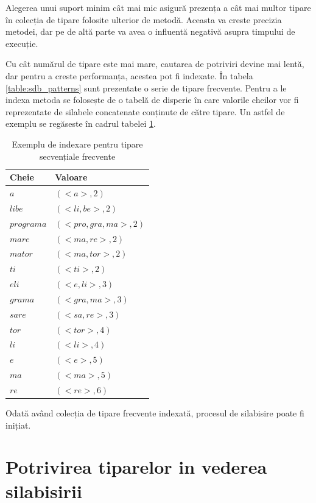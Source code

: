 Alegerea unui suport minim cât mai mic asigură prezența a cât mai multor tipare în colecția de tipare folosite ulterior de metodă. Aceasta va creste precizia metodei, dar pe de altă parte va avea o influentă negativă asupra timpului de execuție. 

Cu cât numărul de tipare este mai mare, cautarea de potriviri devine mai lentă, dar pentru a creste performanța, acestea pot fi indexate. În tabela \ref{table:sdb_patterns} sunt prezentate o serie de tipare frecvente. Pentru a le indexa metoda se folosește de o tabelă de disperie în care valorile cheilor vor fi reprezentate de silabele concatenate conținute de către tipare. Un astfel de exemplu se regăseste în cadrul tabelei \ref{table:sdb_index}. 

\begin{table}[h!]
\centering    
\begin{tabular}{|l|l|}    
\hline      
Cheie & Valoare\\
\hline
$a$ 		& $(<a>, 2)$  \\
$libe$ 		& $(<li, be>, 2)$  \\
$programa$ 	& $(<pro, gra, ma>, 2)$  \\
$mare$ 		& $(<ma, re>, 2)$  \\
$mator$ 	& $(<ma, tor>, 2)$  \\
$ti$ 		& $(<ti>, 2)$  \\
$eli$ 		& $(<e, li>, 3)$  \\
$grama$ 	& $(<gra, ma>, 3)$  \\
$sare$ 		& $(<sa, re>, 3)$  \\
$tor$ 		& $(<tor>, 4)$  \\
$li$ 		& $(<li>, 4)$  \\
$e$ 		& $(<e>, 5)$  \\
$ma$ 		& $(<ma>, 5)$  \\
$re$ 		& $(<re>, 6)$  \\
\hline
\end{tabular}
\caption{Exemplu de indexare pentru tipare secvențiale frecvente}
\label{table:sdb_index}               
\end{table}  

Odată având colecția de tipare frecvente indexată, procesul de silabisire poate fi inițiat. 
 
\section{Potrivirea tiparelor in vederea silabisirii}

